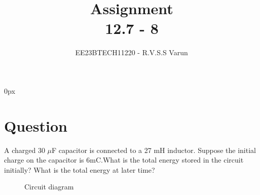 \documentclass[journal,12pt,twocolumn]{IEEEtran}
\theoremstyle{remark}
\begin{document}
\parindent 0px


\title{Assignment\\[1ex]12.7 - 8}
\author{EE23BTECH11220 - R.V.S.S Varun$^{}$%
}
\maketitle
\newpage
\bigskip

\renewcommand{\thefigure}{\theenumi}
\renewcommand{\thetable}{\theenumi}
\section*{Question}
A charged 30 $\mu$F capacitor is connected to a 27 mH inductor. Suppose the initial charge on the capacitor is 6mC.What is the total energy stored in the circuit initially? What is the
total energy at later time?
\fi
\begin{figure}[h]


  
    

    



  
  
       
  
    \caption{Circuit diagram}
     
   \label{fig:12.7.8.1}
\end{figure}
\end{document}
